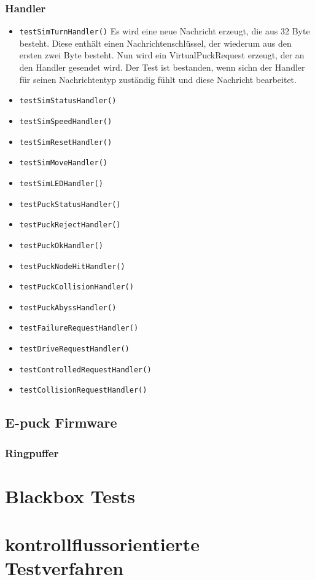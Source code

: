 \documentclass[10pt,a4paper]{article}
\begin{document}
			\subsubsection{Handler}
			\begin{itemize}
				\item \texttt{testSimTurnHandler()} Es wird eine neue Nachricht erzeugt, die aus 32 Byte besteht. Diese enthält einen Nachrichtenschlüssel, der wiederum aus den ersten zwei 					Byte besteht. Nun wird ein VirtualPuckRequest erzeugt, der an den Handler gesendet wird. Der Test ist bestanden, wenn sichn der Handler für seinen Nachrichtentyp zuständig 					fühlt und diese Nachricht bearbeitet.
				\item \texttt{testSimStatusHandler()}
				\item \texttt{testSimSpeedHandler()}
				\item \texttt{testSimResetHandler()}
				\item \texttt{testSimMoveHandler()}
				\item \texttt{testSimLEDHandler()}
				\item \texttt{testPuckStatusHandler()}
				\item \texttt{testPuckRejectHandler()}
				\item \texttt{testPuckOkHandler()}
				\item \texttt{testPuckNodeHitHandler()}
				\item \texttt{testPuckCollisionHandler()}
				\item \texttt{testPuckAbyssHandler()}
				\item \texttt{testFailureRequestHandler()}
				\item \texttt{testDriveRequestHandler()}
				\item \texttt{testControlledRequestHandler()}
				\item \texttt{testCollisionRequestHandler()}
			\end{itemize}
		
		\subsection{E-puck Firmware}
		
			\subsubsection{Ringpuffer}
	
	\section{Blackbox Tests}
	
	\section{kontrollflussorientierte Testverfahren}

				 			
\end{document}
